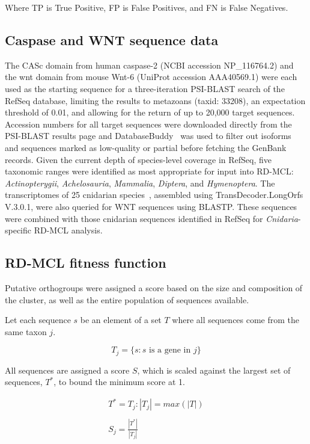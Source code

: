 \documentclass[twocolumn]{bmcart}%
\begin{document}
Where TP is True Positive, FP is False Positives, and FN is False Negatives.

\subsection{Caspase and WNT sequence data}\label{subsec:caspaseAndWntSequenceData}
The CASc domain from human caspase-2 (NCBI accession NP_116764.2) and the wnt domain from mouse Wnt-6 (UniProt accession AAA40569.1) were each used as the starting sequence for a three-iteration PSI-BLAST search of the RefSeq database, limiting the results to metazoans (taxid: 33208), an expectation threshold of 0.01, and allowing for the return of up to 20,000 target sequences.
Accession numbers for all target sequences were downloaded directly from the PSI-BLAST results page and DatabaseBuddy~\cite{Bond:2017bj} was used to filter out isoforms and sequences marked as low-quality or partial before fetching the GenBank records.
Given the current depth of species-level coverage in RefSeq, five taxonomic ranges were identified as most appropriate for input into RD-MCL: \textit{Actinopterygii}, \textit{Achelosauria}, \textit{Mammalia}, \textit{Diptera}, and \textit{Hymenoptera}.
The transcriptomes of 25 cnidarian species~\cite{Zapata:2015cc}, assembled using TransDecoder.LongOrfs V.3.0.1, were also queried for WNT sequences using BLASTP\@.
These sequences were combined with those cnidarian sequences identified in RefSeq for \textit{Cnidaria}-specific RD-MCL analysis.

\subsection{RD-MCL fitness function}\label{subsec:rd-mclFitnessFunction}
Putative orthogroups were assigned a score based on the size and composition of the cluster, as well as the entire population of sequences available.

Let each sequence $s$ be an element of a set $T$ where all sequences come from the same taxon $j$.

\[
T_j = \{s:s \text{ is a gene in } j\}
\]

All sequences are assigned a score $S$, which is scaled against the largest set of sequences, $T^*$, to bound the minimum score at 1.

\begin{gather*}
    T^* = T_j:|T_j| = max(|T|)\\
    \\
    S_j = \frac{|T^*|}{|T_j|}\\
\end{gather*}
\end{document}
